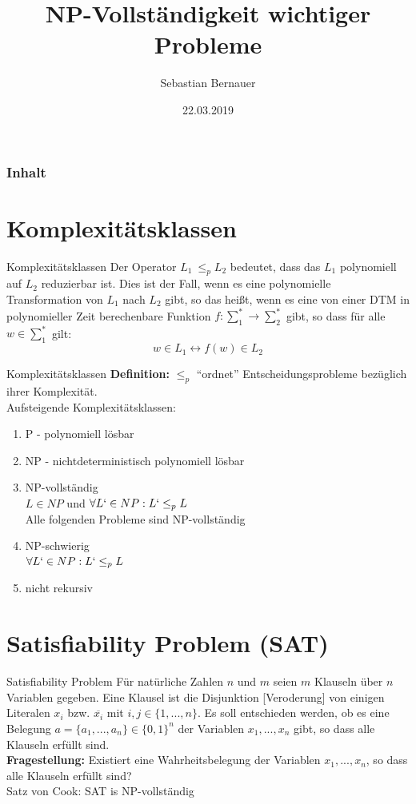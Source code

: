 \documentclass[12pt,handout,notes=dontshow,xcolor=table]{beamer}
\author{Sebastian Bernauer}
\title{NP-Vollständigkeit wichtiger Probleme}
\date{22.03.2019}
\begin{document}
\begin{frame}
\titlepage
\end{frame}

\begin{frame}[allowframebreaks]
\frametitle{Inhalt}
\tableofcontents
\end{frame}

\section{Komplexitätsklassen}
\begin{frame}{Komplexitätsklassen}
Der Operator $L_1\ \le_p L_2$ bedeutet, dass das $L_1$ polynomiell auf $L_2$ reduzierbar ist.
Dies ist der Fall, wenn es eine polynomielle Transformation von $L_1$ nach $L_2$ gibt, so das heißt, wenn es eine von einer DTM in polynomieller Zeit berechenbare Funktion $f: \sum_1^* \rightarrow \sum_2^*$ gibt, so dass für alle $w \in \sum_1^*$ gilt:
$$w \in L_1 \leftrightarrow f(w) \in L_2$$
\end{frame}

\begin{frame}{Komplexitätsklassen}
\textbf{Definition:} \(\leq_p\) ``ordnet'' Entscheidungsprobleme bezüglich ihrer Komplexität.\\
Aufsteigende Komplexitätsklassen:
\begin{enumerate}
\item P - polynomiell lösbar
\pause
\item NP - nichtdeterministisch polynomiell lösbar
\pause
\item NP-vollständig\\
\textrightarrow \(L \in NP\) und \(\forall L` \in NP: L` \leq_p L\)\\
\pause
\textrightarrow Alle folgenden Probleme sind NP-vollständig
\pause
\item NP-schwierig\\
\textrightarrow \(\forall L` \in NP: L` \leq_p L\)
\pause
\item nicht rekursiv
\end{enumerate}
\end{frame}

\section{Satisfiability Problem (SAT)}
\begin{frame}{Satisfiability Problem}
Für natürliche Zahlen \(n\) und \(m\) seien \(m\) Klauseln über \(n\) Variablen gegeben.
Eine Klausel ist die Disjunktion [Veroderung] von einigen Literalen \(x_i\) bzw. \(\overline{x_i}\) mit \(i,j \in \{1,...,n\}\). Es soll entschieden werden, ob es eine Belegung \(a = \{a_1,...,a_n\} \in \{0,1\}^n\) der Variablen \(x_1,...,x_n\) gibt, so dass alle Klauseln erfüllt sind.\\
\pause
\textbf{Fragestellung:} Existiert eine Wahrheitsbelegung der Variablen \(x_1,...,x_n\), so dass alle Klauseln erfüllt sind?\\
\pause
\textrightarrow Satz von Cook: SAT is NP-vollständig
\end{frame}
\end{document}
